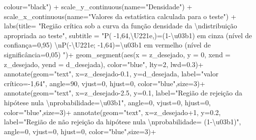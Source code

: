 \documentclass[
]{book}
\newenvironment{Shaded}{\begin{snugshade}}{\end{snugshade}}
\newcommand{\AttributeTok}[1]{\textcolor[rgb]{0.77,0.63,0.00}{#1}}
\newcommand{\DecValTok}[1]{\textcolor[rgb]{0.00,0.00,0.81}{#1}}
\newcommand{\FloatTok}[1]{\textcolor[rgb]{0.00,0.00,0.81}{#1}}
\newcommand{\FunctionTok}[1]{\textcolor[rgb]{0.00,0.00,0.00}{#1}}
\newcommand{\NormalTok}[1]{#1}
\newcommand{\SpecialCharTok}[1]{\textcolor[rgb]{0.00,0.00,0.00}{#1}}
\newcommand{\StringTok}[1]{\textcolor[rgb]{0.31,0.60,0.02}{#1}}
\begin{document}
\begin{Shaded}
\begin{Highlighting}[]
            \AttributeTok{colour=}\StringTok{"black"}\NormalTok{) }\SpecialCharTok{+}
  \FunctionTok{scale\_y\_continuous}\NormalTok{(}\AttributeTok{name=}\StringTok{"Densidade"}\NormalTok{) }\SpecialCharTok{+}
  \FunctionTok{scale\_x\_continuous}\NormalTok{(}\AttributeTok{name=}\StringTok{"Valores da estatística calculada para o teste"}\NormalTok{)  }\SpecialCharTok{+}
  \FunctionTok{labs}\NormalTok{(}\AttributeTok{title=} 
         \StringTok{"Região crítica sob a curva da função densidade da }\SpecialCharTok{\textbackslash{}n}\StringTok{distribuição apropriada ao teste"}\NormalTok{, }
       \AttributeTok{subtitle =} \StringTok{"P( {-}1,64,\textbackslash{}U221e,)=(1{-}\textbackslash{}u03b1) em cinza (nível de confiança=0,95) }\SpecialCharTok{\textbackslash{}n}\StringTok{P({-}\textbackslash{}U221e; {-}1,64)=\textbackslash{}u03b1 em vermelho (nível de significância=0,05) "}\NormalTok{)}\SpecialCharTok{+}
\FunctionTok{geom\_segment}\NormalTok{(}\FunctionTok{aes}\NormalTok{(}\AttributeTok{x =}\NormalTok{ z\_desejado, }\AttributeTok{y =} \DecValTok{0}\NormalTok{, }\AttributeTok{xend =}\NormalTok{ z\_desejado, }\AttributeTok{yend =}\NormalTok{ d\_desejada), }\AttributeTok{color=}\StringTok{"blue"}\NormalTok{, }\AttributeTok{lty=}\DecValTok{2}\NormalTok{, }\AttributeTok{lwd=}\FloatTok{0.3}\NormalTok{)}\SpecialCharTok{+}
\FunctionTok{annotate}\NormalTok{(}\AttributeTok{geom=}\StringTok{"text"}\NormalTok{, }\AttributeTok{x=}\NormalTok{z\_desejado}\FloatTok{{-}0.1}\NormalTok{, }\AttributeTok{y=}\NormalTok{d\_desejada, }\AttributeTok{label=}\StringTok{"valor crítico={-}1,64"}\NormalTok{, }\AttributeTok{angle=}\DecValTok{90}\NormalTok{, }\AttributeTok{vjust=}\DecValTok{0}\NormalTok{, }\AttributeTok{hjust=}\DecValTok{0}\NormalTok{, }\AttributeTok{color=}\StringTok{"blue"}\NormalTok{,}\AttributeTok{size=}\DecValTok{3}\NormalTok{)}\SpecialCharTok{+}
\FunctionTok{annotate}\NormalTok{(}\AttributeTok{geom=}\StringTok{"text"}\NormalTok{, }\AttributeTok{x=}\NormalTok{z\_desejado}\FloatTok{{-}2.5}\NormalTok{, }\AttributeTok{y=}\FloatTok{0.1}\NormalTok{, }\AttributeTok{label=}\StringTok{"Região de rejeição da hipótese nula }\SpecialCharTok{\textbackslash{}n}\StringTok{probabilidade=\textbackslash{}u03b1"}\NormalTok{, }\AttributeTok{angle=}\DecValTok{0}\NormalTok{, }\AttributeTok{vjust=}\DecValTok{0}\NormalTok{, }\AttributeTok{hjust=}\DecValTok{0}\NormalTok{, }\AttributeTok{color=}\StringTok{"blue"}\NormalTok{,}\AttributeTok{size=}\DecValTok{3}\NormalTok{)}\SpecialCharTok{+}
\FunctionTok{annotate}\NormalTok{(}\AttributeTok{geom=}\StringTok{"text"}\NormalTok{, }\AttributeTok{x=}\NormalTok{z\_desejado}\SpecialCharTok{+}\DecValTok{1}\NormalTok{, }\AttributeTok{y=}\FloatTok{0.2}\NormalTok{, }\AttributeTok{label=}\StringTok{"Região de não rejeição da hipótese nula  }\SpecialCharTok{\textbackslash{}n}\StringTok{probabilidade= (1{-}\textbackslash{}u03b1)"}\NormalTok{, }\AttributeTok{angle=}\DecValTok{0}\NormalTok{, }\AttributeTok{vjust=}\DecValTok{0}\NormalTok{, }\AttributeTok{hjust=}\DecValTok{0}\NormalTok{, }\AttributeTok{color=}\StringTok{"blue"}\NormalTok{,}\AttributeTok{size=}\DecValTok{3}\NormalTok{)}\SpecialCharTok{+}

\end{Highlighting}
\end{Shaded}
\end{document}
